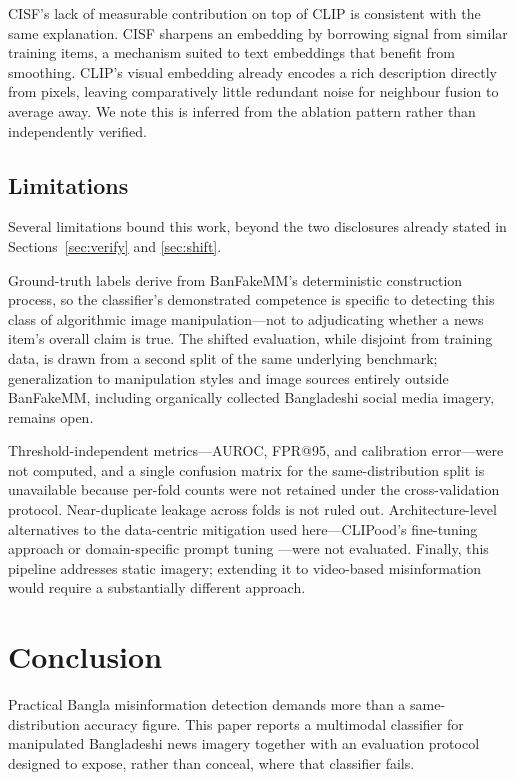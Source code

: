 \documentclass[conference,a4paper]{IEEEtran}
\begin{document}
CISF's lack of measurable contribution on top of CLIP is consistent with the
same explanation. CISF sharpens an embedding by borrowing signal from similar
training items, a mechanism suited to text embeddings that benefit from
smoothing. CLIP's visual embedding already encodes a rich description directly
from pixels, leaving comparatively little redundant noise for neighbour fusion
to average away. We note this is inferred from the ablation pattern rather
than independently verified.

\subsection{Limitations}

Several limitations bound this work, beyond the two disclosures already stated
in Sections~\ref{sec:verify} and \ref{sec:shift}.

Ground-truth labels derive from BanFakeMM's deterministic construction
process, so the classifier's demonstrated competence is specific to detecting
this class of algorithmic image manipulation---not to adjudicating whether a
news item's overall claim is true. The shifted evaluation, while disjoint from
training data, is drawn from a second split of the same underlying benchmark;
generalization to manipulation styles and image sources entirely outside
BanFakeMM, including organically collected Bangladeshi social media imagery,
remains open.

Threshold-independent metrics---AUROC, FPR@95, and calibration error---were
not computed, and a single confusion matrix for the same-distribution split is
unavailable because per-fold counts were not retained under the
cross-validation protocol. Near-duplicate leakage across folds is not ruled
out. Architecture-level alternatives to the data-centric mitigation used
here---CLIPood's fine-tuning approach \cite{clipood} or domain-specific prompt
tuning \cite{dpod}---were not evaluated. Finally, this pipeline addresses
static imagery; extending it to video-based misinformation would require a
substantially different approach.

\section{Conclusion}

Practical Bangla misinformation detection demands more than a
same-distribution accuracy figure. This paper reports a multimodal classifier
for manipulated Bangladeshi news imagery together with an evaluation protocol
designed to expose, rather than conceal, where that classifier fails.
\end{document}
